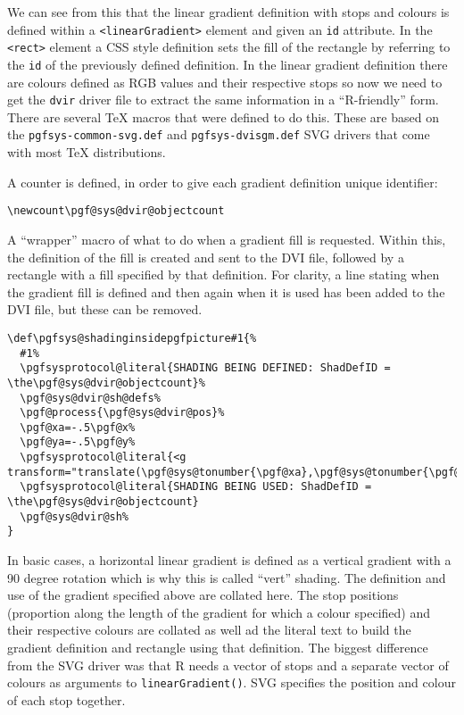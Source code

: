 \documentclass[]{article}
\begin{document}
We can see from this that the linear gradient definition with stops and
colours is defined within a
\texttt{\textless{}linearGradient\textgreater{}} element and given an
\texttt{id} attribute. In the \texttt{\textless{}rect\textgreater{}}
element a CSS style definition sets the fill of the rectangle by
referring to the \texttt{id} of the previously defined definition. In
the linear gradient definition there are colours defined as RGB values
and their respective stops so now we need to get the \texttt{dvir}
driver file to extract the same information in a ``R-friendly'' form.
There are several \TeX{} macros that were defined to do this. These are
based on the \texttt{pgfsys-common-svg.def} and
\texttt{pgfsys-dvisgm.def} SVG drivers that come with most \TeX{}
distributions.

A counter is defined, in order to give each gradient definition unique
identifier:

\begin{verbatim}
\newcount\pgf@sys@dvir@objectcount
\end{verbatim}

A ``wrapper'' macro of what to do when a gradient fill is requested.
Within this, the definition of the fill is created and sent to the DVI
file, followed by a rectangle with a fill specified by that definition.
For clarity, a line stating when the gradient fill is defined and then
again when it is used has been added to the DVI file, but these can be
removed.

\begin{verbatim}
\def\pgfsys@shadinginsidepgfpicture#1{%
  #1%
  \pgfsysprotocol@literal{SHADING BEING DEFINED: ShadDefID = \the\pgf@sys@dvir@objectcount}%
  \pgf@sys@dvir@sh@defs% 
  \pgf@process{\pgf@sys@dvir@pos}%
  \pgf@xa=-.5\pgf@x%
  \pgf@ya=-.5\pgf@y%
  \pgfsysprotocol@literal{<g transform="translate(\pgf@sys@tonumber{\pgf@xa},\pgf@sys@tonumber{\pgf@ya})">}%
  \pgfsysprotocol@literal{SHADING BEING USED: ShadDefID = \the\pgf@sys@dvir@objectcount}
  \pgf@sys@dvir@sh%
}
\end{verbatim}

In basic cases, a horizontal linear gradient is defined as a vertical
gradient with a 90 degree rotation which is why this is called ``vert''
shading. The definition and use of the gradient specified above are
collated here. The stop positions (proportion along the length of the
gradient for which a colour specified) and their respective colours are
collated as well ad the literal text to build the gradient definition
and rectangle using that definition. The biggest difference from the SVG
driver was that R needs a vector of stops and a separate vector of
colours as arguments to \texttt{linearGradient()}. SVG specifies the
position and colour of each stop together.
\end{document}
